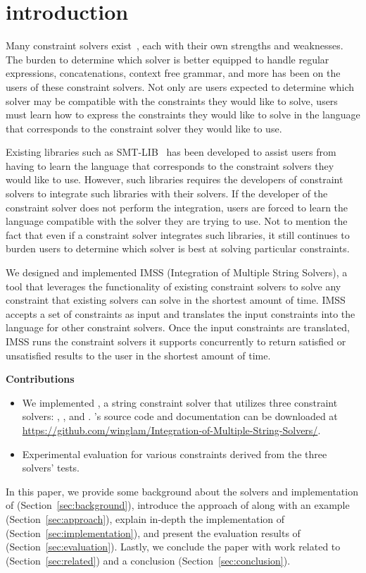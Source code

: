 \section{introduction}
\label{sec:introduction}
Many constraint solvers exist~\cite{solvers}, each with their own strengths and weaknesses. The burden to determine which solver is better equipped to handle regular expressions, concatenations, context free grammar, and more has been on the users of these constraint solvers. Not only are users expected to determine which solver may be compatible with the constraints they would like to solve, users must learn how to express the constraints they would like to solve in the language that corresponds to the constraint solver they would like to use.

Existing libraries such as SMT-LIB~\cite{smtlib2015} has been developed to assist users from having to learn the language that corresponds to the constraint solvers they would like to use. However, such libraries requires the developers of constraint solvers to integrate such libraries with their solvers. If the developer of the constraint solver does not perform the integration, users are forced to learn the language compatible with the solver they are trying to use. Not to mention the fact that even if a constraint solver integrates such libraries, it still continues to burden users to determine which solver is best at solving particular constraints.

We designed and implemented IMSS (Integration of Multiple String Solvers), a tool that leverages the functionality of existing constraint solvers to solve any constraint that existing solvers can solve in the shortest amount of time. IMSS accepts a set of constraints as input and translates the input constraints into the language for other constraint solvers. Once the input constraints are translated, IMSS runs the constraint solvers it supports concurrently to return satisfied or unsatisfied results to the user in the shortest amount of time.

\textbf{Contributions}
\begin{itemize}
    \item We implemented \imss, a string constraint solver that utilizes three constraint solvers:
    \hampi, \dprle, and \zstr. \imss's source code and documentation can be downloaded at
    \url{https://github.com/winglam/Integration-of-Multiple-String-Solvers/}.
    \item Experimental evaluation for various constraints derived from the three solvers' tests.
\end{itemize}

In this paper, we provide some background about the solvers and implementation of \imss (Section~\ref{sec:background}), introduce the approach of \imss along with
an example (Section~\ref{sec:approach}), explain in-depth the
implementation of \imss (Section~\ref{sec:implementation}), and present the evaluation
results of \imss (Section~\ref{sec:evaluation}). Lastly, we conclude the paper with work related to \imss
(Section~\ref{sec:related}) and a conclusion (Section~\ref{sec:conclusion}).
